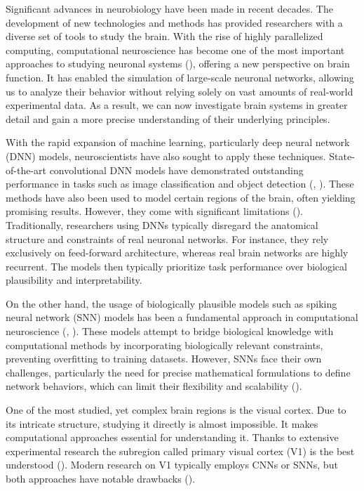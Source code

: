 

Significant advances in neurobiology have been made in recent decades. 
The development of new technologies and
methods has provided researchers with a diverse set of tools to
study the brain. With the rise of highly parallelized computing, 
computational neuroscience has become one of the most important
approaches to studying neuronal systems (\citet{trappenberg2009fundamentals}), 
offering a new perspective on
brain function. It has enabled the simulation of large-scale neuronal
networks, allowing us to analyze their behavior without relying solely
on vast amounts of real-world experimental data. As a result, we can
now investigate brain systems in greater detail and gain a more precise
understanding of their underlying principles.

With the rapid expansion of machine learning, particularly deep neural
network (DNN) models, neuroscientists have also sought to apply these techniques.
State-of-the-art convolutional DNN models have demonstrated outstanding
performance in tasks such as image classification and object detection
(\citet{krizhevsky2012imagenet}, \citet{li2014medical}). 
These methods have also been used to model certain regions of the brain, often
yielding promising results. However, they come
with significant limitations (\citet{celeghin2023convolutional}).
Traditionally, researchers using DNNs typically disregard the anatomical structure
and constraints of real neuronal networks. For instance, they rely exclusively on 
feed-forward architecture, whereas real brain networks are highly recurrent.
The models then typically prioritize task performance over biological plausibility
and interpretability.

On the other hand, the usage of biologically plausible models such as
spiking neural network (SNN) models has been a fundamental approach in computational
neuroscience (\citet{ghosh2009spiking}, \citet{yamazaki2022spiking}). 
These models attempt to bridge biological knowledge with computational
methods by incorporating biologically relevant constraints, preventing overfitting to
training datasets. However, SNNs face their own challenges, particularly the need for precise mathematical formulations to define network behaviors, which can
limit their flexibility and scalability (\citet{izhikevich2004model}).

One of the most studied, yet complex brain regions is the visual cortex.
Due to its intricate structure, studying it directly is almost impossible.
It makes computational approaches essential for understanding it. 
Thanks to extensive experimental research the subregion called primary visual
cortex (V1) is the best understood (\citet{miikkulainen2006computational}). 
Modern research on V1 typically employs CNNs or SNNs, but both approaches
have notable drawbacks (\citet{niell2021cortical}).

